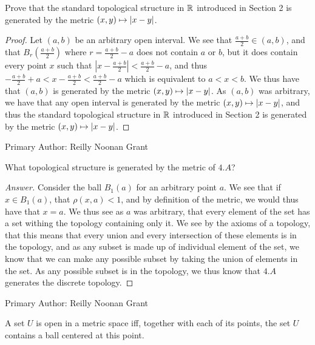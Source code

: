 \begin{majorEx}%
    Prove that the standard topological structure in $\mathbb{R}$ introduced in Section
    2 is generated by the metric $(x, y) \mapsto |x - y|$.
\end{majorEx}

\begin{proof}
  Let $(a,b)$ be an arbitrary open interval. We see that $\frac{a+b}{2}\in
  (a,b)$, and that $B_r(\frac{a+b}{2})$ where $r=\frac{a+b}{2}-a$ does
  not contain $a$ or $b$, but it does contain every point $x$ such
  that $|x-\frac{a+b}{2}|<\frac{a+b}{2}-a$, and thus 
  $-\frac{a+b}{2}+a<x-\frac{a+b}{2}<\frac{a+b}{2}-a$ which is
  equivalent to $a<x<b$. We thus have that $(a,b)$ is generated by the
  metric $(x, y) \mapsto |x - y|$. As $(a,b)$ was arbitrary, we
  have that any open interval is generated by the metric $(x, y)
  \mapsto |x - y|$, and thus the standard topological structure in
  $\mathbb{R}$ introduced in Section 2 is generated by the metric $(x, y)
  \mapsto |x - y|$.   
\end{proof}

Primary Author: Reilly Noonan Grant

\begin{minorEx}%
    What topological structure is generated by the metric of $4.A$?
\end{minorEx}

\begin{proof}[Answer]
  Consider the ball $B_1(a)$ for an arbitrary point $a$. We
  see that if $x \in B_1(a)$, that $\rho(x,a)<1$, and by definition of
  the metric, we would thus have that $x=a$. We thus see as $a$ was
  arbitrary, that every element of the set has a set withing the
  topology containing only it. We see by the axioms of a topology,
  that this means that every union and every intersection of these
  elements is in the topology, and as any subset is made up of
  individual element of the set, we know that we can make any possible subset
  by taking the union of elements in the set. As any possible subset
  is in the topology, we thus know that $4.A$ generates the discrete topology.
\end{proof}

Primary Author: Reilly Noonan Grant

\begin{majorEx}%
  A set $U$ is open in a metric space iff, together
  with each of its points, the set $U$ contains a
  ball centered at this point.
\end{majorEx}

